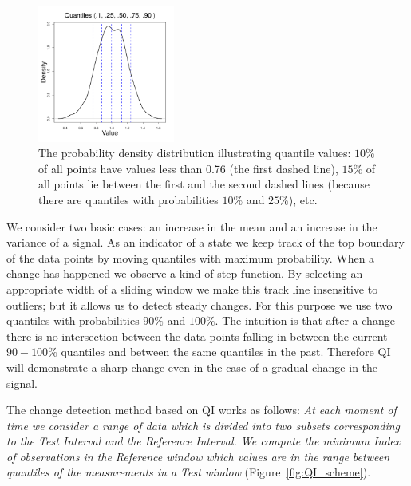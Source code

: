 \begin{figure}[htb!]
\centering
\includegraphics[width=0.4\textwidth]{pics/cfb_paper/QuantileDef}
\caption{The probability density distribution illustrating quantile values: $10\%$ of all points have values less than 0.76 (the first dashed line),
$15\%$ of all points lie between the first and the second dashed lines (because there are quantiles with probabilities $10\%$ and $25\%$), etc.}
\label{fig:PDD_quantile}
\end{figure}

We consider two basic cases: an increase in the mean and an increase in the variance of a signal. 
As an indicator of a state we keep track of the top boundary of the data points by moving quantiles with maximum probability. 
When a change has happened we observe a kind of step function. By selecting an appropriate width of a sliding window we make this track line insensitive to outliers; but it allows us to detect steady changes.
For this purpose we use two quantiles with probabilities $90\%$ and $100\%$.
The intuition is that after a change there is no intersection between the data points falling in between the current $90-100\%$ quantiles and between the same quantiles in the past. Therefore QI will demonstrate a sharp change even in the case of a gradual change in the signal.

The change detection method based on QI works as follows:
\textit{
At each moment of time we consider a range of data which is divided into two subsets corresponding to the Test Interval and the Reference Interval.
We compute the minimum Index of observations in the Reference window which values are in the range between quantiles of the measurements in a Test window} (Figure~\ref{fig:QI_scheme}).

